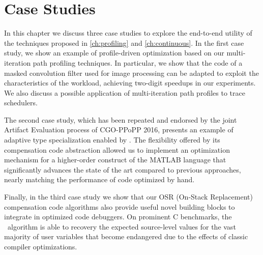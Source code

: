 \chapter{Case Studies}
\label{ch:case-studies}

In this chapter we discuss three case studies to explore the end-to-end utility of the techniques proposed in \mychapter\ref{ch:profiling} and \mychapter\ref{ch:continuous}. In the first case study, we show an example of profile-driven optimization based on our multi-iteration path profiling techniques. In particular, we show that the code of a masked convolution filter used for image processing can be adapted to exploit the characteristics of the workload, achieving two-digit speedups in our experiments. We also discuss a possible application of multi-iteration path profiles to trace schedulers.

The second case study, which has been repeated and endorsed by the joint Artifact Evaluation process of CGO-PPoPP 2016, presents an example of adaptive type specialization enabled by \osrkit. The flexibility offered by its compensation code abstraction allowed us to implement an optimization mechanism for a higher-order construct of the MATLAB language that significantly advances the state of the art compared to previous approaches, nearly matching the performance of code optimized by hand.


Finally, in the third case study we show that our OSR (On-Stack Replacement) compensation code algorithms also provide useful novel building blocks to integrate in optimized code debuggers. On prominent C benchmarks, the \reconstruct\ algorithm is able to recovery the expected source-level values for the vast majority of user variables that become endangered due to the effects of classic compiler optimizations.






